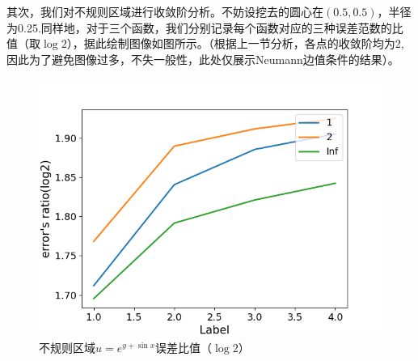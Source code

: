 \documentclass{ctexart}
\begin{document}
\begin{sloppypar}
其次，我们对不规则区域进行收敛阶分析。不妨设挖去的圆心在$(0.5,0.5)$，半径为0.25.同样地，对于三个函数，我们分别记录每个函数对应的三种误差范数的比值（取$\log 2$），据此绘制图像如图所示。（根据上一节分析，各点的收敛阶均为2,因此为了避免图像过多，不失一般性，此处仅展示Neumann边值条件的结果）。
\begin{figure}[H]
\centering
\includegraphics[scale = 0.5]{f1_INE.png}
\caption{不规则区域$u=e^{y+\sin x}$误差比值（$\log 2$）}
\label{fig7}
\end{figure}


\end{sloppypar}
\end{document}
